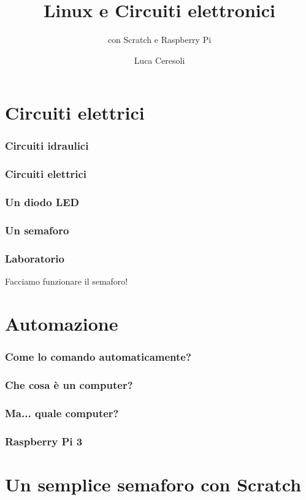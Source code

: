 \documentclass[xetex,table]{beamer}
\title{Linux e Circuiti elettronici}
\subtitle{con Scratch e Raspberry Pi}
\author{Luca Ceresoli}
\date{}
\begin{document}
\maketitle

\section{Circuiti elettrici}

\begin{frame}
  \frametitle{Circuiti idraulici}
\end{frame}

\begin{frame}
  \frametitle{Circuiti elettrici}
\end{frame}

\begin{frame}
  \frametitle{Un diodo LED}
\end{frame}

\begin{frame}
  \frametitle{Un semaforo}
\end{frame}

\begin{frame}
  \frametitle{Laboratorio}
  \begin{center}
    \LARGE
    Facciamo funzionare il semaforo!
  \end{center}
\end{frame}

\section{Automazione}

\begin{frame}
  \frametitle{Come lo comando automaticamente?}
\end{frame}

\begin{frame}
  \frametitle{Che cosa è un computer?}
\end{frame}

\begin{frame}
  \frametitle{Ma... quale computer?}
\end{frame}

\begin{frame}
  \frametitle{Raspberry Pi 3}
\end{frame}

\section{Un semplice semaforo con Scratch}
\end{document}

